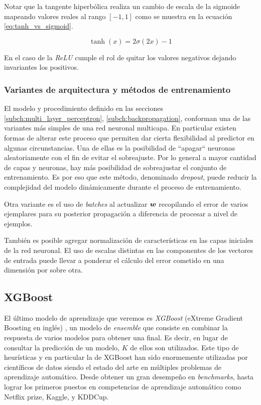Notar que la tangente hiperbólica realiza un cambio de escala de la sigmoide
mapeando valores reales al rango $[-1, 1]$ como se muestra en la ecuación
\ref{eq:tanh_vs_sigmoid}.

\begin{equation} \label{eq:tanh_vs_sigmoid}
    \tanh\left( x \right) = 2 \sigma(2x) - 1
\end{equation}

En el caso de la \emph{ReLU} cumple el rol de quitar los valores negativos
dejando invariantes los positivos.

\subsubsection{Variantes de arquitectura y métodos de entrenamiento}

El modelo y procedimiento definido en las secciones
\ref{subch:multi_layer_perceptron}, \ref{subch:backpropagation}, conforman una
de las variantes más simples de una red neuronal multicapa. En particular
existen formas de alterar este proceso que permiten dar cierta flexibilidad al
predictor en algunas circunstancias. Una de ellas es la posibilidad de
``apagar`` neuronas aleatoriamente con el fin de evitar el sobreajuste. Por lo
general a mayor cantidad de capas y neuronas, hay más posibilidad de
sobreajustar el conjunto de entrenamiento. Es por eso que este método,
denominado \emph{dropout}, puede reducir la complejidad del modelo dinámicamente
durante el proceso de entrenamiento.

Otra variante es el uso de \emph{batches} al actualizar $\boldsymbol{w}$ recopilando
el error de varios ejemplares para su posterior propagación a diferencia de
procesar a nivel de ejemplos.

También es posible agregar normalización de características en las capas
iniciales de la red neuronal. El uso de escalas distintas en las componentes de
los vectores de entrada puede llevar a ponderar el cálculo del error cometido en
una dimensión por sobre otra.

\subsection{XGBoost}
\label{alg:xgboost}

El último modelo de aprendizaje que veremos es \emph{XGBoost} (eXtreme Gradient
Boosting en inglés) \citep{Chen-2016}, un modelo de \emph{ensemble} que consiste
en combinar la respuesta de varios modelos para obtener una final. Es decir, en
lugar de consultar la predicción de un modelo, $K$ de ellos son utilizados. Este
tipo de heurísticas y en particular la de XGBoost han sido enormemente
utilizadas por científicos de datos siendo el estado del arte en múltiples
problemas de aprendizaje automático. Desde obtener un gran desempeño en
\emph{benchmarks}, hasta lograr los primeros puestos en competencias de
aprendizaje automático como Netflix prize, Kaggle, y KDDCup.

